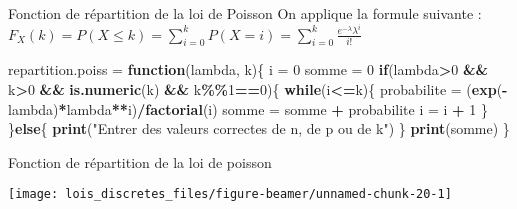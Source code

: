 \documentclass[
  ignorenonframetext,
]{beamer}
\newenvironment{Shaded}{\begin{snugshade}}{\end{snugshade}}
\newcommand{\ControlFlowTok}[1]{\textcolor[rgb]{0.13,0.29,0.53}{\textbf{#1}}}
\newcommand{\DecValTok}[1]{\textcolor[rgb]{0.00,0.00,0.81}{#1}}
\newcommand{\FunctionTok}[1]{\textcolor[rgb]{0.13,0.29,0.53}{\textbf{#1}}}
\newcommand{\NormalTok}[1]{#1}
\newcommand{\OtherTok}[1]{\textcolor[rgb]{0.56,0.35,0.01}{#1}}
\newcommand{\SpecialCharTok}[1]{\textcolor[rgb]{0.81,0.36,0.00}{\textbf{#1}}}
\newcommand{\StringTok}[1]{\textcolor[rgb]{0.31,0.60,0.02}{#1}}
\begin{document}
\begin{frame}[fragile]{Fonction de répartition de la loi de Poisson}
\protect\hypertarget{fonction-de-ruxe9partition-de-la-loi-de-poisson}{}
On applique la formule suivante :
\(F_X (k) = P(X\le k) = \sum_{i=0}^k P(X=i) = \sum_{i=0}^k \frac{e^{-\lambda} \lambda^{i}}{i!}\)

\begin{Shaded}
\begin{Highlighting}[]
\NormalTok{repartition.poiss }\OtherTok{=} \ControlFlowTok{function}\NormalTok{(lambda, k)\{}
\NormalTok{  i }\OtherTok{=} \DecValTok{0}
\NormalTok{  somme }\OtherTok{=} \DecValTok{0}
  \ControlFlowTok{if}\NormalTok{(lambda}\SpecialCharTok{\textgreater{}}\DecValTok{0} \SpecialCharTok{\&\&}\NormalTok{ k}\SpecialCharTok{\textgreater{}}\DecValTok{0} \SpecialCharTok{\&\&} \FunctionTok{is.numeric}\NormalTok{(k) }\SpecialCharTok{\&\&}\NormalTok{ k}\SpecialCharTok{\%\%}\DecValTok{1}\SpecialCharTok{==}\DecValTok{0}\NormalTok{)\{}
    \ControlFlowTok{while}\NormalTok{(i}\SpecialCharTok{\textless{}=}\NormalTok{k)\{}
\NormalTok{      probabilite }\OtherTok{=}\NormalTok{ (}\FunctionTok{exp}\NormalTok{(}\SpecialCharTok{{-}}\NormalTok{lambda)}\SpecialCharTok{*}\NormalTok{lambda}\SpecialCharTok{**}\NormalTok{i)}\SpecialCharTok{/}\FunctionTok{factorial}\NormalTok{(i)}
\NormalTok{      somme }\OtherTok{=}\NormalTok{ somme }\SpecialCharTok{+}\NormalTok{ probabilite}
\NormalTok{      i }\OtherTok{=}\NormalTok{ i }\SpecialCharTok{+} \DecValTok{1}
\NormalTok{      \}}
\NormalTok{    \}}\ControlFlowTok{else}\NormalTok{\{}
    \FunctionTok{print}\NormalTok{(}\StringTok{"Entrer des valeurs correctes de n, de p ou de k"}\NormalTok{)}
\NormalTok{    \}}
 \FunctionTok{print}\NormalTok{(somme)}
\NormalTok{\}}
\end{Highlighting}
\end{Shaded}
\end{frame}

\begin{frame}{Fonction de répartition de la loi de poisson}
\protect\hypertarget{fonction-de-ruxe9partition-de-la-loi-de-poisson-1}{}
\begin{center}\texttt{[image: lois\_discretes\_files/figure-beamer/unnamed-chunk-20-1]} \end{center}
\end{frame}
\end{document}
